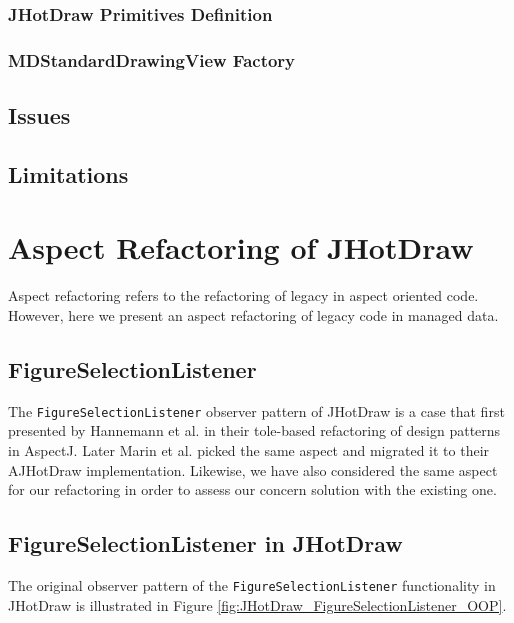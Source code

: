 
\subsubsection{JHotDraw Primitives Definition}


\subsubsection{MDStandardDrawingView Factory}

\subsection{Issues}

\subsection{Limitations}

\section{Aspect Refactoring of JHotDraw}
Aspect refactoring refers to the refactoring of legacy in aspect oriented code. 
However, here we present an aspect refactoring of legacy code in managed data.

\subsection{FigureSelectionListener}
The \texttt{FigureSelectionListener} observer pattern of JHotDraw is a case that first presented by Hannemann et al. \cite{hannemann2005role} in their tole-based refactoring of design patterns in AspectJ. 
Later Marin et al. picked the same aspect and migrated it to their AJHotDraw implementation.
Likewise, we have also considered the same aspect for our refactoring in order to assess our concern solution with the existing one.

\subsection{FigureSelectionListener in JHotDraw}
The original observer pattern of the \texttt{FigureSelectionListener} functionality in JHotDraw is illustrated in Figure \ref{fig:JHotDraw_FigureSelectionListener_OOP}.

